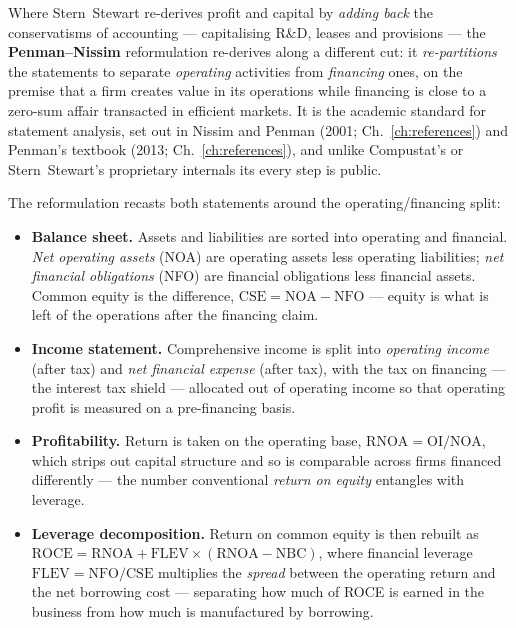 \documentclass[11pt,a4paper]{report}
\begin{document}
Where Stern~Stewart re-derives profit and capital by \emph{adding back} the conservatisms of accounting ---
capitalising R\&D, leases and provisions --- the \textbf{Penman--Nissim} reformulation re-derives along a
different cut: it \emph{re-partitions} the statements to separate \emph{operating} activities from
\emph{financing} ones, on the premise that a firm creates value in its operations while financing is close to
a zero-sum affair transacted in efficient markets. It is the academic standard for statement analysis, set out
in Nissim and Penman (2001; Ch.~\ref{ch:references}) and Penman's textbook (2013; Ch.~\ref{ch:references}),
and unlike Compustat's or Stern~Stewart's proprietary internals its every step is public.

The reformulation recasts both statements around the operating/financing split:
\begin{itemize}
  \item \textbf{Balance sheet.} Assets and liabilities are sorted into operating and financial. \emph{Net
    operating assets} (NOA) are operating assets less operating liabilities; \emph{net financial obligations}
    (NFO) are financial obligations less financial assets. Common equity is the difference,
    $\mathrm{CSE} = \mathrm{NOA} - \mathrm{NFO}$ --- equity is what is left of the operations after the
    financing claim.
  \item \textbf{Income statement.} Comprehensive income is split into \emph{operating income} (after tax) and
    \emph{net financial expense} (after tax), with the tax on financing --- the interest tax shield ---
    allocated out of operating income so that operating profit is measured on a pre-financing basis.
  \item \textbf{Profitability.} Return is taken on the operating base, $\mathrm{RNOA} = \mathrm{OI}/\mathrm{NOA}$,
    which strips out capital structure and so is comparable across firms financed differently --- the number
    conventional \emph{return on equity} entangles with leverage.
  \item \textbf{Leverage decomposition.} Return on common equity is then rebuilt as
    $\mathrm{ROCE} = \mathrm{RNOA} + \mathrm{FLEV} \times (\mathrm{RNOA} - \mathrm{NBC})$, where financial
    leverage $\mathrm{FLEV} = \mathrm{NFO}/\mathrm{CSE}$ multiplies the \emph{spread} between the operating
    return and the net borrowing cost --- separating how much of ROCE is earned in the business from how much
    is manufactured by borrowing.
\end{itemize}
\end{document}
